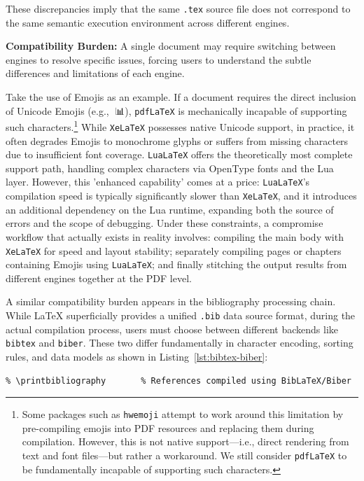 These discrepancies imply that the same \texttt{.tex} source file does not correspond to the same semantic execution environment across different engines.

\textbf{Compatibility Burden:} A single document may require switching between engines to resolve specific issues, forcing users to understand the subtle differences and limitations of each engine.

Take the use of Emojis as an example. If a document requires the direct inclusion of Unicode Emojis (e.g., 🙂📊), \texttt{pdfLaTeX} is mechanically incapable of supporting such characters.\footnote{Some packages such as \texttt{hwemoji} attempt to work around this limitation by pre-compiling emojis into PDF resources and replacing them during compilation. However, this is not native support---i.e., direct rendering from text and font files---but rather a workaround. We still consider \texttt{pdfLaTeX} to be fundamentally incapable of supporting such characters.} While \texttt{XeLaTeX} possesses native Unicode support, in practice, it often degrades Emojis to monochrome glyphs or suffers from missing characters due to insufficient font coverage. \texttt{LuaLaTeX} offers the theoretically most complete support path, handling complex characters via OpenType fonts and the Lua layer. However, this 'enhanced capability' comes at a price: \texttt{LuaLaTeX}'s compilation speed is typically significantly slower than \texttt{XeLaTeX}, and it introduces an additional dependency on the Lua runtime, expanding both the source of errors and the scope of debugging. Under these constraints, a compromise workflow that actually exists in reality involves: compiling the main body with \texttt{XeLaTeX} for speed and layout stability; separately compiling pages or chapters containing Emojis using \texttt{LuaLaTeX}; and finally stitching the output results from different engines together at the PDF level.

A similar compatibility burden appears in the bibliography processing chain. While \LaTeX{} superficially provides a unified \texttt{.bib} data source format, during the actual compilation process, users must choose between different backends like \texttt{bibtex} and \texttt{biber}. These two differ fundamentally in character encoding, sorting rules, and data models as shown in Listing~\ref{lst:bibtex-biber}:

\begin{lstlisting}[caption={BibTeX vs BibLaTeX},label={lst:bibtex-biber}]
   % References compiled using BibTeX
% \printbibliography       % References compiled using BibLaTeX/Biber
\end{lstlisting}

